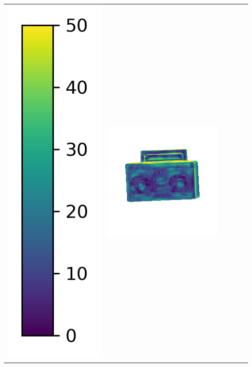 \begin{center}
\begin{tabularx}{\linewidth}{@{}Y@{}Y@{}Y@{}Y@{}Y@{}Y@{}}
\includegraphics[width=0.2\linewidth]{semisynthetic/colorbar_error_vertical.png} &
\includegraphics[width=\linewidth]{semisynthetic/20160617_19_ours_err.png} &

\end{tabularx}
\end{center}
